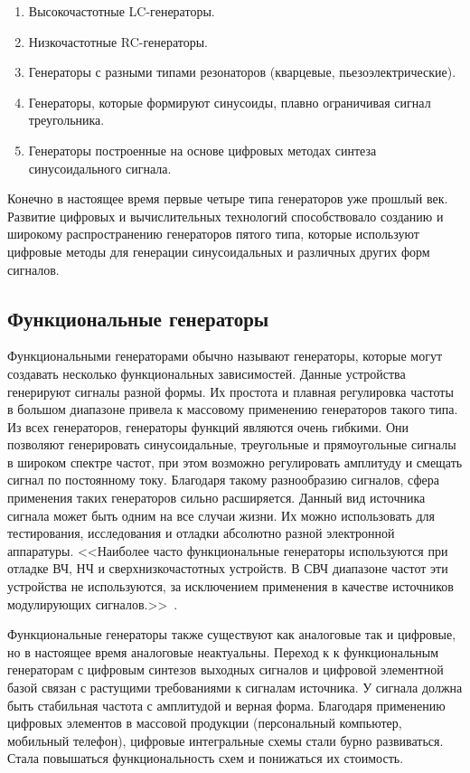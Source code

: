 \begin{enumerate}
	\item Высокочастотные LC-генераторы.
	\item Низкочастотные RC-генераторы.
	\item Генераторы с разными типами резонаторов (кварцевые, пьезоэлектрические).
	\item Генераторы, которые формируют синусоиды, плавно ограничивая сигнал треугольника.
	\item Генераторы построенные на основе цифровых методах синтеза синусоидального сигнала.
\end{enumerate}

Конечно в настоящее время первые четыре типа генераторов уже прошлый век. Развитие цифровых и вычислительных технологий способствовало созданию и широкому распространению генераторов пятого типа, которые используют цифровые методы для генерации синусоидальных и различных других форм сигналов.

\subsection{Функциональные генераторы}
Функциональными генераторами обычно называют генераторы, которые могут создавать несколько функциональных зависимостей. Данные устройства генерируют сигналы разной формы. Их простота и плавная регулировка частоты в большом диапазоне привела к массовому применению генераторов такого типа. Из всех генераторов, генераторы функций являются очень гибкими. Они позволяют генерировать синусоидальные, треугольные и прямоугольные сигналы в широком спектре частот, при этом возможно регулировать амплитуду и смещать сигнал по постоянному току. Благодаря такому разнообразию сигналов, сфера применения таких генераторов сильно расширяется. Данный вид источника сигнала может быть одним на все случаи жизни. Их можно использовать для тестирования, исследования и отладки абсолютно разной электронной аппаратуры. <<Наиболее часто функциональные генераторы используются при отладке ВЧ, НЧ и сверхнизкочастотных устройств. В СВЧ диапазоне частот эти устройства не используются, за исключением применения в качестве источников модулирующих сигналов.>>~\cite{dgs}.

Функциональные генераторы также существуют как аналоговые так и цифровые, но в настоящее время аналоговые неактуальны. Переход к к функциональным генераторам с цифровым синтезов выходных сигналов и цифровой элементной базой связан с растущими требованиями к сигналам источника. У сигнала должна быть стабильная частота с амплитудой и верная форма. Благодаря применению цифровых элементов в массовой продукции (персональный компьютер, мобильный телефон), цифровые интегральные схемы стали бурно развиваться. Стала повышаться функциональность схем и понижаться их стоимость.



